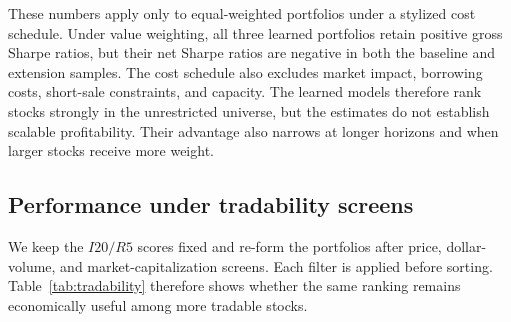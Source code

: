 These numbers apply only to equal-weighted portfolios under a stylized cost schedule. Under value weighting, all three learned portfolios retain positive gross Sharpe ratios, but their net Sharpe ratios are negative in both the baseline and extension samples. The cost schedule also excludes market impact, borrowing costs, short-sale constraints, and capacity. The learned models therefore rank stocks strongly in the unrestricted universe, but the estimates do not establish scalable profitability. Their advantage also narrows at longer horizons and when larger stocks receive more weight.

\subsection{Performance under tradability screens}\label{subsec:tradability_results}

We keep the $I20/R5$ scores fixed and re-form the portfolios after price, dollar-volume, and market-capitalization screens. Each filter is applied before sorting. Table~\ref{tab:tradability} therefore shows whether the same ranking remains economically useful among more tradable stocks.

